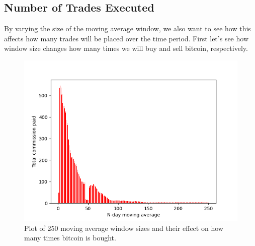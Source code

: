 \documentclass[12pt]{article}
\begin{document}
\subsection{Number of Trades Executed}
By varying the size of the moving average window, we also want to see how this affects how many trades will be placed over the time period.
First let's see how window size changes how many times we will buy and sell bitcoin, respectively.

\begin{figure}[h!]
    \includegraphics[totalheight=8cm]{figures/btc_pur.png}
    \centering
    \caption{Plot of 250 moving average window sizes and their effect on how many times bitcoin is bought.}
    \label{btc_pur}
\end{figure}
\end{document}
